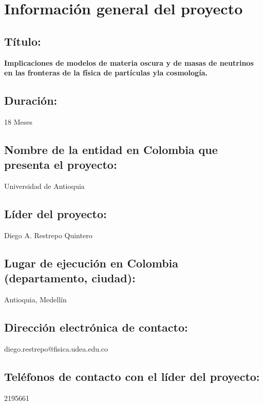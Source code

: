 
\section{Información general del proyecto}
\subsection{Título:}
\textbf{Implicaciones de modelos de materia oscura y de masas de neutrinos en las fronteras de la física de partículas yla cosmología.}
\subsection{Duración: }
18 Meses
\subsection{Nombre de la entidad en Colombia que presenta el proyecto:}
Universidad de Antioquia
\subsection{Líder del proyecto: }
Diego A. Restrepo Quintero
\subsection{Lugar de ejecución en Colombia (departamento, ciudad): }
Antioquia, Medellín
\subsection{Dirección electrónica de contacto:}
diego.restrepo@fisica.udea.edu.co
\subsection{Teléfonos de contacto con el líder del proyecto: }
2195661


